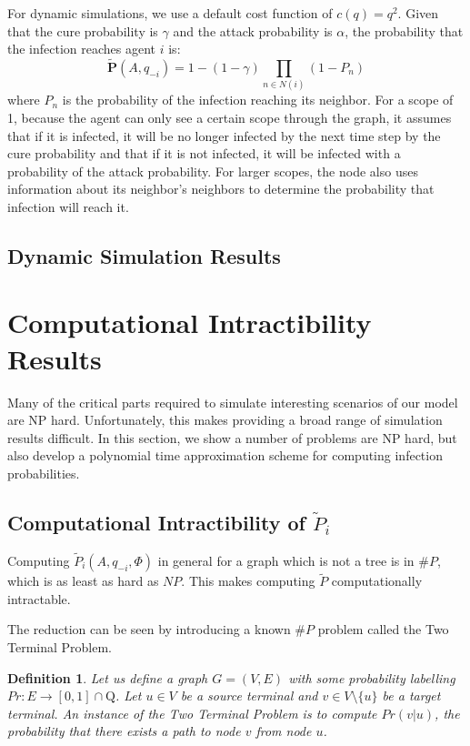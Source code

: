 \documentclass{article}
\theoremstyle{plain}
\newtheorem{definition}{Definition}
\begin{document}
For dynamic simulations, we use a default cost function of $c(q) = q^2$. Given that the cure probability is $\gamma$ and the attack probability is $\alpha$, the probability that the infection reaches agent $i$ is:
\begin{equation}
	\tilde{\textbf{P}}(A,q_{-i}) = 1 - (1 - \gamma) \prod_{n \in N(i)}{(1-P_n)}
\end{equation}
where $P_n$ is the probability of the infection reaching its neighbor. For a scope of 1, because the agent can only see a certain scope through the graph, it assumes that if it is infected, it will be no longer infected by the next time step by the cure probability and that if it is not infected, it will be infected with a probability of the attack probability. For larger scopes, the node also uses information about its neighbor's neighbors to determine the probability that infection will reach it.

\subsection{Dynamic Simulation Results}

\section{Computational Intractibility Results}

Many of the critical parts required to simulate interesting scenarios of our model are NP hard. Unfortunately, this makes providing a broad range of simulation results difficult. In this section, we show a number of problems are NP hard, but also develop a polynomial time approximation scheme for computing infection probabilities.

\subsection{Computational Intractibility of $\tilde{P}_i$}

Computing $\tilde{P}_i(A, q_{-i}, \Phi)$ in general for a graph which is not a tree is in $\# P$, which is as least as hard as $NP$. This makes computing $\tilde{P}$ computationally intractable.

The reduction can be seen by introducing a known $\# P$ problem called the Two Terminal Problem.

\begin{definition}
  Let us define a graph $G = (V, E)$ with some probability labelling $Pr: E \to [0,1] \cap \mathrm{Q}$. Let $u \in V$ be a source terminal and $v \in V \setminus \{u\}$ be a target terminal. An instance of the \emph{Two Terminal Problem} is to compute $Pr(v | u)$, the probability that there exists a path to node $v$ from node $u$.
\end{definition}
\end{document}
